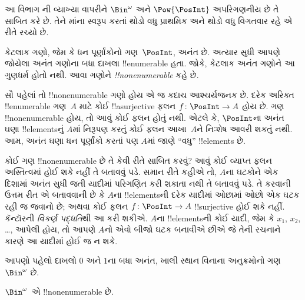 \documentclass[../../../include/open-logic-section]{subfiles}
\begin{document}


\begin{editorial}
  આ વિભાગ ની વ્યાખ્યા વાપરીને
  $\Bin^\omega$ અને $\Pow{\PosInt}$ અપરિગણનીય છે તે સાબિત કરે છે.
  તેને માંના સ્વરૂપ કરતાં થોડો વધુ
  પ્રાથમિક અને થોડો વધુ વિગતવાર રહે એ રીતે રચ્યો છે.

\end{editorial}

કેટલાક ગણો, જેમ કે ધન પૂર્ણાંકોનો ગણ~$\PosInt$, અનંત છે.
અત્યાર સુધી આપણે જોયેલા અનંત ગણોના બધા દાખલા
!!{enumerable} હતા. જોકે, કેટલાક અનંત ગણોને આ ગુણધર્મ
હોતો નથી. આવા ગણોને \emph{!!{nonenumerable}} કહે છે.

સૌ પહેલાં તો !!{nonenumerable} ગણો હોય એ જ કદાચ આશ્ચર્યજનક છે.
દરેક અરિક્ત !!{enumerable} ગણ~$A$ માટે કોઈ !!a{surjective} ફલન
$f \colon \PosInt \to A$ હોય છે. ગણ !!{nonenumerable} હોય,
તો આવું કોઈ ફલન હોતું નથી. એટલે કે, $\PosInt$ના અનંત ઘણા
!!{element}sનું $A$માં નિરૂપણ કરતું કોઈ ફલન આખા~$A$ને
નિઃશેષ આવરી શકતું નથી. આમ, અનંત ઘણા ધન પૂર્ણાંકો કરતાં પણ
$A$માં જાણે ``વધુ'' !!{element}s છે.

કોઈ ગણ !!{nonenumerable} છે તે કેવી રીતે સાબિત કરવું?
આવું કોઈ વ્યાપ્ત ફલન અસ્તિત્વમાં હોઈ શકે નહીં તે બતાવવું પડે.
સમાન રીતે કહીએ તો, $A$ના ઘટકોને એક દિશામાં અનંત સુધી જતી
યાદીમાં પરિગણિત કરી શકાતા નથી તે બતાવવું પડે. તે કરવાની ઉત્તમ
રીત એ બતાવવાની છે કે $A$ના !!{element}sની દરેક યાદીમાં ઓછામાં
ઓછો એક ઘટક રહી જ જવાનો છે; અથવા કોઈ ફલન
$f\colon \PosInt \to A$ !!{surjective} હોઈ શકે નહીં. કૅન્ટૉરની
\emph{વિકર્ણ પદ્ધતિ}થી આ કરી શકીએ. $A$ના !!{element}sની કોઈ
યાદી, જેમ કે $x_1$, $x_2$, \dots, આપેલી હોય, તો આપણે $A$નો
એવો બીજો ઘટક બનાવીએ છીએ જે તેની રચનાને કારણે આ યાદીમાં હોઈ જ ન શકે.

આપણો પહેલો દાખલો $0$ અને $1$ના બધા અનંત, ખાલી સ્થાન વિનાના
અનુક્રમોનો ગણ~$\Bin^\omega$ છે.

\begin{thm}
$\Bin^\omega$~એ !!{nonenumerable} છે.
\end{thm}
\end{document}
